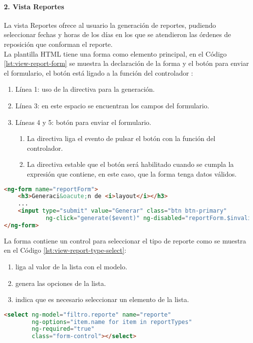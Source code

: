\paragraph{2. Vista Reportes\\}
La vista Reportes ofrece al usuario la generación de reportes, pudiendo seleccionar fechas y horas de los días en los que se atendieron las órdenes de reposición que conforman el reporte.\\
La plantilla HTML tiene una forma como elemento principal, en el Código \ref{lst:view-report-form} se muestra la declaración de la forma y el botón para enviar el formulario, el botón está ligado a la función  del controlador :

\begin{enumerate}
	\item Línea 1: uso de la directiva  para la generación.
	\item Línea 3: en este espacio se encuentran los campos del formulario.
	\item Líneas 4 y 5: botón para enviar el formulario.
	\begin{enumerate}
		\item La directiva  liga el evento de pulsar el botón con la función del controlador.
		\item La directiva  estable que el botón será habilitado cuando se cumpla la expresión que contiene, en este caso, que la forma tenga datos válidos.
	\end{enumerate}
\end{enumerate}

\begin{lstlisting}[language=HTML, captionpos=b, caption={Forma de generación de reportes}, label={lst:view-report-form}]
<ng-form name="reportForm">
	<h3>Generaci&oacute;n de <i>layout</i></h3>
	...
	<input type="submit" value="Generar" class="btn btn-primary"
			ng-click="generate($event)" ng-disabled="reportForm.$invalid"/>	
</ng-form>
\end{lstlisting}

La forma contiene un control para seleccionar el tipo de reporte como se muestra en el Código \ref{lst:view-report-type-select}:
\begin{enumerate}
	\item {} liga al valor de la lista con el modelo.
	\item {} genera las opciones de la lista.
	\item {} indica que es necesario seleccionar un elemento de la lista.
\end{enumerate}
\begin{lstlisting}[language=HTML, captionpos=b, caption={Lista para seleccionar el tipo de reporte.}, label={lst:view-report-type-select}]
<select ng-model="filtro.reporte" name="reporte"
		ng-options="item.name for item in reportTypes"
		ng-required="true"
		class="form-control"></select>
\end{lstlisting}

